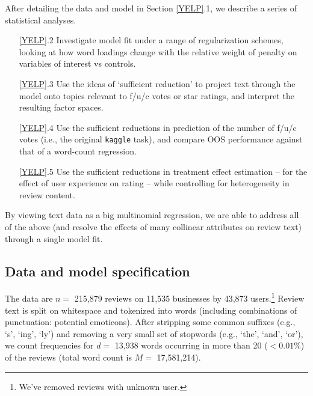 \documentclass[12pt]{article}
\newcommand{\sgl}{\setstretch{1.1}}
\newcommand{\cd}[1]{{\tt#1}}
\begin{document}
After detailing the  data and model in Section
\ref{YELP}.1, we describe a series of statistical analyses.
\begin{itemize}\sgl
\item[\ref{YELP}.2] Investigate model fit under a range of regularization
schemes, looking at how word loadings change with the relative  weight of
penalty on variables of interest vs controls.
\item[\ref{YELP}.3] Use the ideas of `sufficient reduction' to project text
through the model onto topics relevant to f/u/c votes or star ratings, and
interpret the resulting factor spaces.
\item[\ref{YELP}.4] Use the sufficient reductions in prediction of the
number of f/u/c votes (i.e., the original \cd{kaggle} task), and compare
OOS performance against that of a word-count regression.
\item[\ref{YELP}.5] Use the sufficient reductions in treatment effect
estimation -- for the effect of user experience on rating -- while controlling
for heterogeneity in review content.
\end{itemize}
By viewing text data as a big multinomial regression, we are able to address
all of the above (and resolve the effects of many collinear attributes on
review text) through a single model fit.

\subsection{Data and model specification}

The data are $n=$ 215,879 reviews on 11,535 businesses by 43,873
users.\footnote{We've removed reviews with unknown user.} Review text is split
on whitespace and tokenized into words (including combinations of punctuation:
potential emoticons). After stripping some common suffixes (e.g., `s', `ing',
`ly') and removing a very small set of stopwords (e.g., `the', `and', `or'),
we count frequencies for $d=$ 13,938 words occurring in more than 20 ($<
0.01\%$) of the reviews (total word count is $M=$ 17,581,214).  
\end{document}
